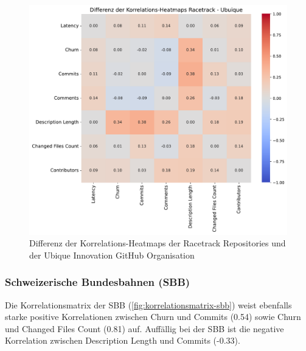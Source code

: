 \begin{figure}[htbp]
\includegraphics[width=\textwidth]{Figures/diff-korrelationsmatrix-racetrack-ubique.pdf}
\caption{Differenz der Korrelations-Heatmaps der Racetrack Repositories und der Ubique Innovation GitHub Organisation}
\label{fig:diff-korrelationsmatrix-racetrack-ubique}
\end{figure}


\subsubsection{Schweizerische Bundesbahnen (SBB)}
Die Korrelationsmatrix der SBB (\autoref{fig:korrelationsmatrix-sbb}) weist ebenfalls starke positive Korrelationen zwischen Churn und Commits (0.54) sowie Churn und Changed Files Count (0.81) auf. Auffällig bei der SBB ist die negative Korrelation zwischen Description Length und Commits (-0.33).

